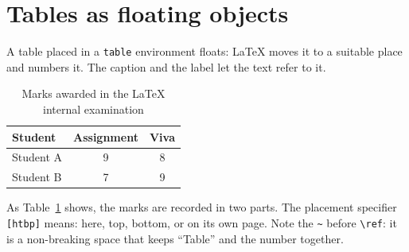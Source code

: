 \documentclass[11pt,a4paper]{article}
\begin{document}
\section{Tables as floating objects}

A table placed in a \texttt{table} environment floats: LaTeX moves
it to a suitable place and numbers it. The caption and the label let
the text refer to it.

\begin{table}[htbp]
  \centering
  \caption{Marks awarded in the LaTeX internal examination}
  \label{tab:marks}
  \begin{tabular}{lcc}
    \toprule
    Student & Assignment & Viva \\
    \midrule
    Student A & 9 & 8 \\
    Student B & 7 & 9 \\
    \bottomrule
  \end{tabular}
\end{table}

As Table~\ref{tab:marks} shows, the marks are recorded in two parts.
The placement specifier \texttt{[htbp]} means: here, top, bottom,
or on its own page. Note the \verb|~| before \verb|\ref|: it is a
non-breaking space that keeps ``Table'' and the number together.
\end{document}

